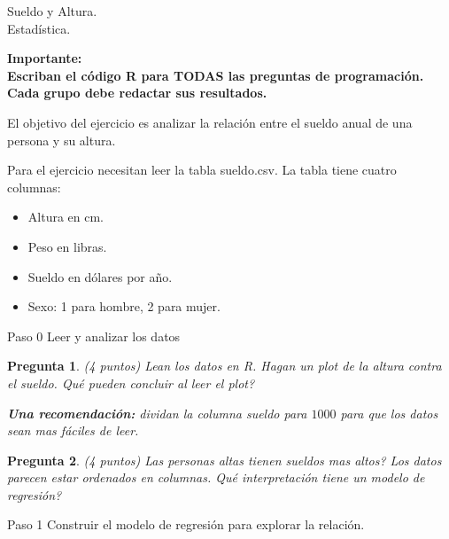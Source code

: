 \documentclass{article}
\newtheorem{pregunta}{Pregunta}
\def\die#1{{\domino#1}}
\newcommand{\skull}{\text{\usefont{U}{skulls}{m}{n}\symbol{'101}}}
\begin{document}
\begin{center}
  \Large Sueldo y Altura. \\
  \null
  Estadística.
\end{center}
\vspace{1cm}

\textbf{Importante:\\
 Escriban el código R para TODAS las preguntas de programación. \\ Cada grupo debe redactar sus resultados.}

\null\hfill

 El objetivo del ejercicio es analizar la relación entre el sueldo anual de una persona y su altura.
\par
Para el ejercicio necesitan leer la tabla sueldo.csv. La tabla tiene cuatro columnas:
\begin{itemize}
  \item Altura en cm.
  \item Peso en libras.
  \item Sueldo en dólares por año.
  \item Sexo: 1 para hombre, 2 para mujer.
\end{itemize}
 \begin{topbot}
   \vspace{0.7em}
   Paso 0 \quad Leer y analizar los datos
   \vspace{0.7em}
 \end{topbot}

\begin{pregunta} (4 puntos)
Lean los datos en R. Hagan un plot de la altura contra el sueldo. Qué pueden concluir al leer el plot?
\par
\textbf{Una recomendación:} dividan la columna sueldo para $1000$ para que los datos sean mas fáciles de leer.
\end{pregunta}

\begin{pregunta} (4 puntos)
Las personas altas tienen sueldos mas altos? Los datos parecen estar ordenados en columnas. Qué interpretación tiene un modelo de regresión?
\end{pregunta}

\begin{topbot}
  \vspace{0.7em}
  Paso 1 \quad Construir el modelo de regresión para explorar la relación.
  \vspace{0.7em}
\end{topbot}
\end{document}
